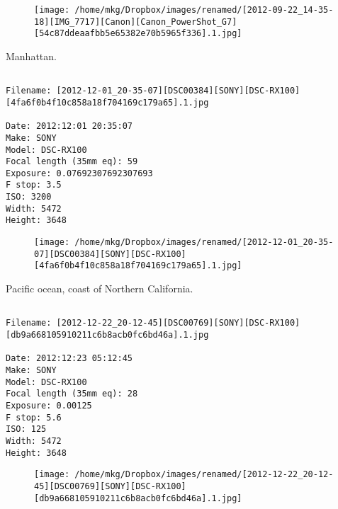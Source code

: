 \begin{figure}
\texttt{[image: /home/mkg/Dropbox/images/renamed/[2012-09-22\_14-35-18][IMG\_7717][Canon][Canon\_PowerShot\_G7][54c87ddeaafbb5e65382e70b5965f336].1.jpg]}
\end{figure}
    
\clearpage
\onecolumn
\noindent Manhattan.
\noindent
\begin{lstlisting}

Filename: [2012-12-01_20-35-07][DSC00384][SONY][DSC-RX100][4fa6f0b4f10c858a18f704169c179a65].1.jpg

Date: 2012:12:01 20:35:07
Make: SONY
Model: DSC-RX100
Focal length (35mm eq): 59
Exposure: 0.07692307692307693
F stop: 3.5
ISO: 3200
Width: 5472
Height: 3648
\end{lstlisting}
\clearpage

\begin{figure}
\texttt{[image: /home/mkg/Dropbox/images/renamed/[2012-12-01\_20-35-07][DSC00384][SONY][DSC-RX100][4fa6f0b4f10c858a18f704169c179a65].1.jpg]}
\end{figure}
    
\clearpage
\onecolumn
\noindent Pacific ocean, coast of Northern California.
\noindent
\begin{lstlisting}

Filename: [2012-12-22_20-12-45][DSC00769][SONY][DSC-RX100][db9a668105910211c6b8acb0fc6bd46a].1.jpg

Date: 2012:12:23 05:12:45
Make: SONY
Model: DSC-RX100
Focal length (35mm eq): 28
Exposure: 0.00125
F stop: 5.6
ISO: 125
Width: 5472
Height: 3648
\end{lstlisting}
\clearpage

\begin{figure}
\texttt{[image: /home/mkg/Dropbox/images/renamed/[2012-12-22\_20-12-45][DSC00769][SONY][DSC-RX100][db9a668105910211c6b8acb0fc6bd46a].1.jpg]}
\end{figure}
    
